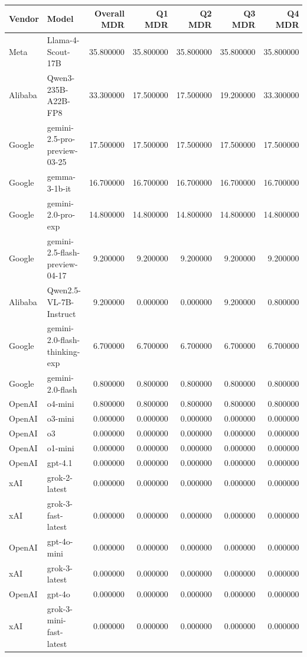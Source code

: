 \begin{tabular}{llrrrrr}
\toprule
Vendor & Model & Overall MDR & Q1 MDR & Q2 MDR & Q3 MDR & Q4 MDR \\
\midrule
Meta & Llama-4-Scout-17B & 35.800000 & 35.800000 & 35.800000 & 35.800000 & 35.800000 \\
Alibaba & Qwen3-235B-A22B-FP8 & 33.300000 & 17.500000 & 17.500000 & 19.200000 & 33.300000 \\
Google & gemini-2.5-pro-preview-03-25 & 17.500000 & 17.500000 & 17.500000 & 17.500000 & 17.500000 \\
Google & gemma-3-1b-it & 16.700000 & 16.700000 & 16.700000 & 16.700000 & 16.700000 \\
Google & gemini-2.0-pro-exp & 14.800000 & 14.800000 & 14.800000 & 14.800000 & 14.800000 \\
Google & gemini-2.5-flash-preview-04-17 & 9.200000 & 9.200000 & 9.200000 & 9.200000 & 9.200000 \\
Alibaba & Qwen2.5-VL-7B-Instruct & 9.200000 & 0.000000 & 0.000000 & 9.200000 & 0.800000 \\
Google & gemini-2.0-flash-thinking-exp & 6.700000 & 6.700000 & 6.700000 & 6.700000 & 6.700000 \\
Google & gemini-2.0-flash & 0.800000 & 0.800000 & 0.800000 & 0.800000 & 0.800000 \\
OpenAI & o4-mini & 0.800000 & 0.800000 & 0.800000 & 0.800000 & 0.800000 \\
OpenAI & o3-mini & 0.000000 & 0.000000 & 0.000000 & 0.000000 & 0.000000 \\
OpenAI & o3 & 0.000000 & 0.000000 & 0.000000 & 0.000000 & 0.000000 \\
OpenAI & o1-mini & 0.000000 & 0.000000 & 0.000000 & 0.000000 & 0.000000 \\
OpenAI & gpt-4.1 & 0.000000 & 0.000000 & 0.000000 & 0.000000 & 0.000000 \\
xAI & grok-2-latest & 0.000000 & 0.000000 & 0.000000 & 0.000000 & 0.000000 \\
xAI & grok-3-fast-latest & 0.000000 & 0.000000 & 0.000000 & 0.000000 & 0.000000 \\
OpenAI & gpt-4o-mini & 0.000000 & 0.000000 & 0.000000 & 0.000000 & 0.000000 \\
xAI & grok-3-latest & 0.000000 & 0.000000 & 0.000000 & 0.000000 & 0.000000 \\
OpenAI & gpt-4o & 0.000000 & 0.000000 & 0.000000 & 0.000000 & 0.000000 \\
xAI & grok-3-mini-fast-latest & 0.000000 & 0.000000 & 0.000000 & 0.000000 & 0.000000 \\
\bottomrule
\end{tabular}

